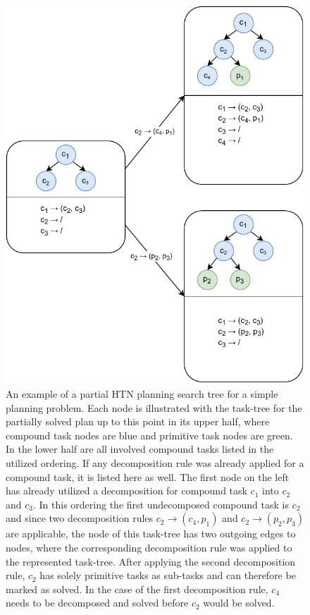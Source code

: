 \begin{figure}[ht!]
    \centering
    \includegraphics[height=0.5\textheight]{gfx/Figures/Approach/HTN.pdf}
    \caption[An example of a partial HTN planning search tree for a simple planning problem.]{An example of a partial HTN planning search tree for a simple planning problem. Each node is illustrated with the task-tree for the partially solved plan up to this point in its upper half, where compound task nodes are blue and primitive task nodes are green.
    In the lower half are all involved compound tasks listed in the utilized ordering.
    If any decomposition rule was already applied for a compound task, it is listed here as well.
    The first node on the left has already utilized a decomposition for compound task $c_1$ into $c_2$ and $c_3$.
    In this ordering the first undecomposed compound task is $c_2$ and since two decomposition rules $c_2 \rightarrow (c_4, p_1)$ and $c_2 \rightarrow (p_2, p_3)$ are applicable, the node of this task-tree has two outgoing edges to nodes, where the corresponding decomposition rule was applied to the represented task-tree.
    After applying the second decomposition rule, $c_2$ has solely primitive tasks as sub-tasks and can therefore be marked as solved.
    In the case of the first decomposition rule, $c_4$ needs to be decomposed and solved before $c_2$ would be solved.
    }
    \label{fig:approach:htn-planning}
\end{figure}

